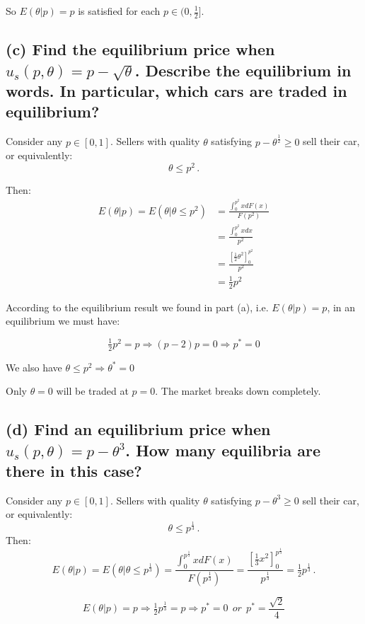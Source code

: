 \documentclass{article}
\begin{document}
So $E(\theta | p) = p$ is satisfied for each $p \in (0,\tfrac12]$.

\subsection*{(c) Find the equilibrium price when $u_s(p, \theta) = p - \sqrt{\theta}$. Describe the equilibrium in words. In
particular, which cars are traded in equilibrium?}

Consider any $p \in [0,1]$. Sellers with quality $\theta$ satisfying $p - \theta^\frac12 \geq 0$ sell their car, or equivalently:$$\theta \leq p^2 \, .$$

Then:
\begin{align*}
E(\theta | p) = E(\theta | \theta \leq p^2) &= \frac{\int_{0}^{p^2}x dF(x)}{F(p^2)} \\
&= \frac{\int_{0}^{p^2}x dx}{p^2} \\
&= \frac{\left[ \tfrac12 \theta^2 \right]^{p^2}_0}{p^2} \\
&= \tfrac12 p^2
\end{align*}

According to the equilibrium result we found in part (a), i.e.
$E(\theta | p) = p$, in an equilibrium we must have:

$$\tfrac12 p^2 = p \Rightarrow (p-2)p = 0 \Rightarrow p^* = 0$$ 

We also have $\theta \leq p^2 \Rightarrow \theta^* = 0$

\medskip

Only $\theta = 0$ will be traded at $p=0$. The market breaks down completely.

\subsection*{(d) Find an equilibrium price when $u_s(p, \theta) = p - \theta^3$. How many equilibria are there in this case?  }

Consider any $p \in [0,1]$. Sellers with quality $\theta$ satisfying $p - \theta^3 \geq 0$ sell their car, or equivalently:$$\theta \leq p^{\tfrac13} \, .$$
Then:
$$E(\theta | p) = E(\theta | \theta \leq p^{\tfrac13})= \frac{\int_{0}^{p^{\frac13}}x dF(x)}{F(p^{\frac13})} = \frac{\left[ \tfrac13 x^2 \right]^{p^{\frac13}}_0}{p^{\frac13}} = \tfrac12 p^{\frac13} \, .$$

$$E(\theta | p) = p \Rightarrow \tfrac12 p^{\frac13} = p \Rightarrow p^*=0 \ \ or \ \ p^*= \frac{\sqrt{2}}{4}$$
\end{document}
